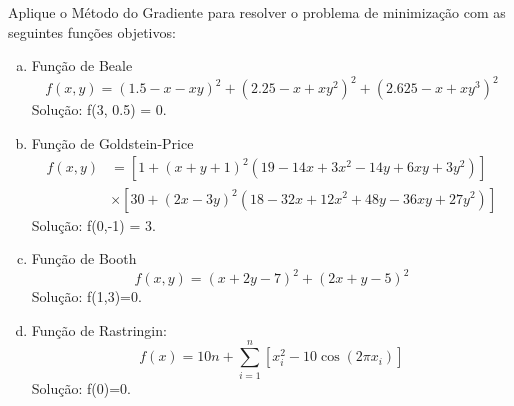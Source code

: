 \begin{exer}
  Aplique o Método do Gradiente para resolver o problema de minimização com as seguintes funções objetivos:
  \begin{enumerate}[a)]
  \item Função de Beale
    \begin{equation}
      f(x,y) = (1.5-x-xy)^2 + (2.25-x+xy^2)^2 + (2.625-x+xy^3)^2
    \end{equation}
    Solução: f(3, 0.5) = 0.
  \item Função de Goldstein-Price
    \begin{align}
      f(x,y) &= \left[1+\left(x+y+1\right)^{2}\left(19-14x+3x^{2}-14y+6xy+3y^{2}\right)\right]\nonumber\\
      &\times \left[30+\left(2x-3y\right)^{2}\left(18-32x+12x^{2}+48y-36xy+27y^{2}\right)\right]
    \end{align}
    Solução: f(0,-1) = 3.
  \item Função de Booth
    \begin{equation}
      f(x,y) = \left( x + 2y -7\right)^{2} + \left(2x +y - 5\right)^{2}
    \end{equation}
    Solução: f(1,3)=0.
  \item Função de Rastringin:
    \begin{equation}
      f(x) = 10 n + \sum_{i=1}^n \left[x_i^2 - 10\cos(2 \pi x_i)\right]
    \end{equation}
    Solução: f(0)=0.
  \end{enumerate}
\end{exer}






